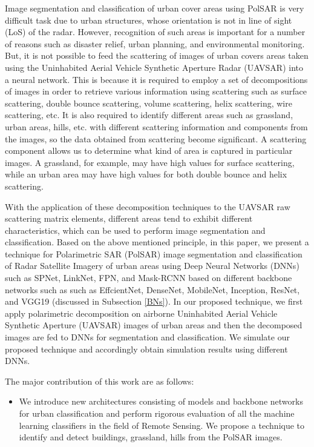 \documentclass[a4paper,12pt]{spieman}  %
\begin{document}
\begin{spacing}{1}
\par Image segmentation and classification of urban cover areas using PolSAR is very difficult task due to urban structures, whose orientation is not in line of sight (LoS) of the radar. However, recognition of such areas is important for a number of reasons such as disaster relief, urban planning, and environmental monitoring. But, it is not possible to feed the scattering of images of urban covers areas taken using the Uninhabited Aerial Vehicle Synthetic Aperture Radar (UAVSAR) into a neural network. This is because it is required to employ a set of decompositions of images in order to retrieve various information using scattering such as surface scattering, double bounce scattering, volume scattering, helix scattering, wire scattering, etc. It is also required to identify different areas such as grassland, urban areas, hills, etc.  with different scattering information and components from the images, so the data obtained from scattering become significant. A scattering component allows us to determine what kind of area is captured in particular images. A grassland, for example, may have high values for surface scattering, while an urban area may have high values for both double bounce and helix scattering.
\par With the application of these decomposition techniques to the UAVSAR raw scattering matrix elements, different areas tend to exhibit different characteristics, which can be used to perform image segmentation and classification. Based on the above mentioned principle, in this paper, we present a technique for Polarimetric SAR (PolSAR) image segmentation and classification of Radar Satellite Imagery of urban areas using Deep Neural Networks (DNNs) such as SPNet, LinkNet, FPN, and Mask-RCNN based on different backbone networks such as such as EffcientNet, DenseNet, MobileNet, Inception, ResNet, and VGG19 (discussed in Subsection \ref{BNs}). In our proposed technique, we first apply polarimetric decomposition on airborne Uninhabited Aerial Vehicle Synthetic Aperture (UAVSAR) images of urban areas and then the decomposed images are fed to DNNs for segmentation and classification. We simulate our proposed technique and accordingly obtain simulation results using different DNNs.
 \par The major contribution of this work are as follows:
\begin{itemize}
    \item We introduce new architectures consisting of models and backbone networks for urban classification and perform rigorous evaluation of all the machine learning classifiers in the field of Remote Sensing. We propose a technique to identify and detect buildings, grassland, hills from the PolSAR images.

\end{itemize}
\end{spacing}
\end{document}
